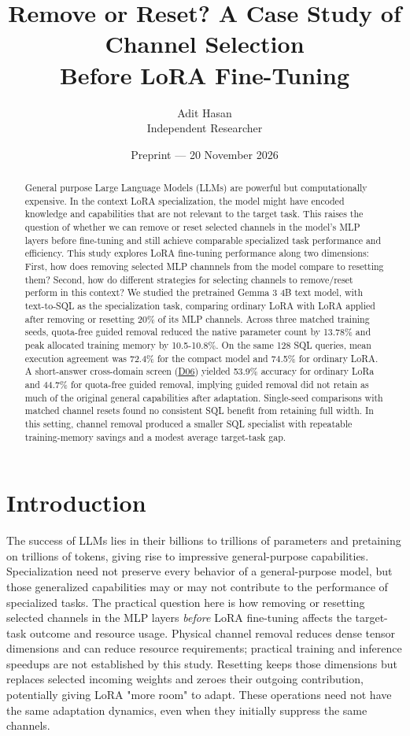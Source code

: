 \documentclass[10pt,letterpaper]{article}
\title{Remove or Reset? A Case Study of Channel Selection\\
Before LoRA Fine-Tuning}
\author{Adit Hasan\\
\small Independent Researcher}
\date{Preprint --- 20 November 2026}
\DeclareRobustCommand{\dataset}[1]{\hyperlink{dataset-#1}{\textnormal{#1}}}
\begin{document}
\maketitle

\begin{abstract}
General purpose Large Language Models (LLMs) are powerful but computationally expensive.
In the context LoRA specialization, the model might have encoded knowledge
and capabilities that are not relevant to the target task. This raises the question of whether
we can remove or reset selected channels in the model's MLP layers before fine-tuning and still
achieve comparable specialized task performance and efficiency.
This study explores LoRA fine-tuning performance along two dimensions: First, how does removing selected
MLP channnels from the model compare to resetting them? Second, how do different strategies
for selecting channels to remove/reset perform in this context? We studied the pretrained 
Gemma 3 4B text model, with text-to-SQL as the specialization task, comparing ordinary LoRA 
with LoRA applied after removing or resetting 20\% of its MLP channels. Across three 
matched training seeds, quota-free guided removal reduced the native parameter count by 13.78\% and peak 
allocated training memory by 10.5-10.8\%. On the same 128 SQL queries, mean execution 
agreement was 72.4\% for the compact model and 74.5\% for ordinary LoRA.
A short-answer cross-domain screen (\dataset{D06}) yielded 53.9\% accuracy for ordinary LoRa and 
44.7\% for quota-free guided removal, implying guided removal did not retain as much of 
the original general capabilities after adaptation. Single-seed comparisons with matched 
channel resets found no consistent SQL benefit from retaining full width. In this setting, 
channel removal produced a smaller SQL specialist with repeatable training-memory savings 
and a modest average target-task gap.
\end{abstract}

\section{Introduction}
\label{sec:introduction}

The success of LLMs lies in their billions to trillions of parameters and
pretaining on trillions of tokens, giving rise to impressive general-purpose capabilities.
Specialization need not preserve every behavior of a general-purpose model, but those generalized
capabilities may or may not contribute to the performance of specialized tasks.
The practical question here is how removing or resetting selected channels in the MLP layers 
\emph{before} LoRA fine-tuning affects the target-task outcome and resource usage. 
Physical channel removal reduces dense tensor dimensions and can reduce
resource requirements; practical training and inference speedups are not
established by this study. Resetting keeps those dimensions but replaces
selected incoming weights and zeroes their outgoing contribution, potentially 
giving LoRA "more room" to adapt. These operations need not have the same
adaptation dynamics, even when they initially suppress the same channels.
\end{document}
